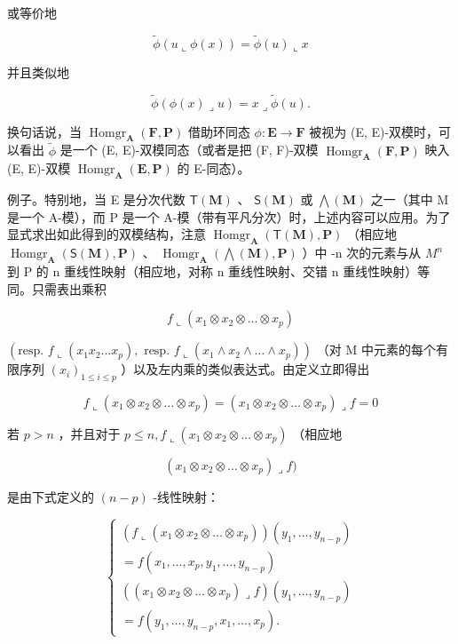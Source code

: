或等价地

\[
\tilde {\phi} (u \llcorner \phi (x)) = \tilde {\phi} (u) \llcorner x\tag{42}
\]

并且类似地

\[
\tilde {\phi} (\phi (x) \lrcorner u) = x \lrcorner \tilde {\phi} (u).\tag{43}
\]

换句话说，当 \(\operatorname{Homgr}_{\mathbf{A}}(\mathbf{F}, \mathbf{P})\) 借助环同态 \(\phi: \mathbf{E} \to \mathbf{F}\) 被视为 (E, E)-双模时，可以看出 \(\tilde{\phi}\) 是一个 (E, E)-双模同态（或者是把 (F, F)-双模 \(\operatorname{Homgr}_{\mathbf{A}}(\mathbf{F}, \mathbf{P})\) 映入 (E, E)-双模 \(\operatorname{Homgr}_{\mathbf{A}}(\mathbf{E}, \mathbf{P})\) 的 E-同态）。

例子。特别地，当 E 是分次代数 \(\mathsf{T}(\mathbf{M})\) 、 \(\mathsf{S}(\mathbf{M})\) 或 \(\bigwedge(\mathbf{M})\) 之一（其中 M 是一个 A-模），而 P 是一个 A-模（带有平凡分次）时，上述内容可以应用。为了显式求出如此得到的双模结构，注意 \(\operatorname{Homgr}_{\mathbf{A}}(\mathsf{T}(\mathbf{M}),\mathbf{P})\) （相应地 \(\operatorname{Homgr}_{\mathbf{A}}(\mathsf{S}(\mathbf{M}),\mathbf{P})\) 、 \(\operatorname{Homgr}_{\mathbf{A}}(\bigwedge(\mathbf{M}),\mathbf{P})\) ）中 -n 次的元素与从 \(M^{n}\) 到 P 的 n 重线性映射（相应地，对称 n 重线性映射、交错 n 重线性映射）等同。只需表出乘积

\[
f \llcorner (x _ {1} \otimes x _ {2} \otimes \dots \otimes x _ {p})
\]

\((\text{resp. } f \llcorner (x_1 x_2 \ldots x_p), \text{ resp. } f \llcorner (x_1 \wedge x_2 \wedge \dots \wedge x_p))\) （对 M 中元素的每个有限序列 \((x_i)_{1 \leq i \leq p}\) ）以及左内乘的类似表达式。由定义立即得出

\[
f \llcorner (x _ {1} \otimes x _ {2} \otimes \dots \otimes x _ {p}) = (x _ {1} \otimes x _ {2} \otimes \dots \otimes x _ {p}) \lrcorner f = 0\tag{44}
\]

若 \(p > n\) ，并且对于 \(p \leqslant n, f \llcorner (x_1 \otimes x_2 \otimes \dots \otimes x_p)\) （相应地

\[
\left(x _ {1} \otimes x _ {2} \otimes \dots \otimes x _ {p}\right) \lrcorner f)
\]

是由下式定义的 \((n - p)\) -线性映射：

\[
\left\{ \begin{array}{l} (f \llcorner (x _ {1} \otimes x _ {2} \otimes \dots \otimes x _ {p})) (y _ {1}, \ldots , y _ {n - p}) \\ = f (x _ {1}, \ldots , x _ {p}, y _ {1}, \ldots , y _ {n - p}) \\ ((x _ {1} \otimes x _ {2} \otimes \dots \otimes x _ {p}) \lrcorner f) (y _ {1}, \ldots , y _ {n - p}) \\ = f (y _ {1}, \ldots , y _ {n - p}, x _ {1}, \ldots , x _ {p}). \end{array} \right.\tag{45}
\]

